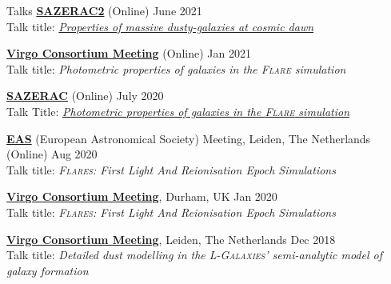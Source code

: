 \documentclass[a4paper,10pt]{resume} %
\begin{document}
\begin{rSection}{Talks}
	{\textbf{\href{http://sazerac-conference.org/2021/}{SAZERAC2}} (Online)} \hfill {June 2021}
	\\
	Talk title: \textit{\href{https://youtu.be/ncObY0lRN5w?list=PLp95u5tgS_YVAYXzVipf1ANzWUASqCc4Q}{\color{blue}\textit{Properties of massive dusty-galaxies at cosmic dawn}}}
	
	{\textbf{\href{http://www.virgo.dur.ac.uk/}{\textrm{Virgo Consortium Meeting}}} (Online)} \hfill {Jan 2021}
	\\
	Talk title: \textit{Photometric properties of galaxies in the \textsc{Flare} simulation}
	
	{\textbf{\href{http://sazerac-conference.org/2020/}{SAZERAC}} (Online)} \hfill {July 2020}
	\\
	Talk Title: \href{https://www.youtube.com/watch?v=S5FeQ6SUqK8}{\color{blue}\textit{Photometric properties of galaxies in the \textsc{Flare} simulation}}
	
	{\textbf{\href{https://eas.unige.ch/EAS2020/}{EAS}} (European Astronomical Society) Meeting, Leiden, The Netherlands (Online)} \hfill {Aug 2020}
	\\
	{Talk title: \textit{\textsc{Flares}: First Light And Reionisation Epoch Simulations}}
	
	{\textbf{\href{http://www.virgo.dur.ac.uk/}{Virgo Consortium Meeting}}, Durham, UK} \hfill {Jan 2020}
	\\
	{Talk title: \textit{\textsc{Flares}: First Light And Reionisation Epoch Simulations}}
	
	{\textbf{\href{http://www.virgo.dur.ac.uk/}{\textrm{Virgo Consortium Meeting}}}, Leiden, The Netherlands} \hfill {Dec 2018}
	\\
	{Talk title: \textit{Detailed dust modelling in the \textsc{L-Galaxies}’ semi-analytic model of galaxy formation}}
\end{rSection}

\end{document}
